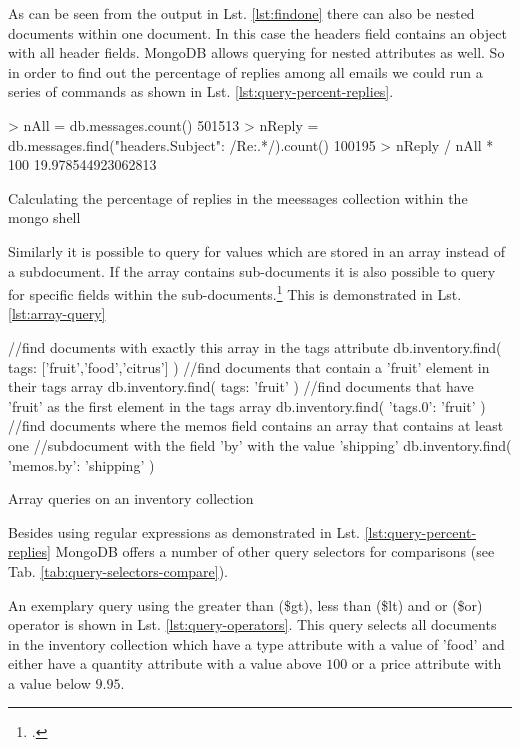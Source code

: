 As can be seen from the output in Lst. \ref{lst:findone} there can also be nested documents
within one document. In this case the headers field contains an object with all header fields.
MongoDB allows querying for nested attributes as well. So in order to find out the percentage of
replies among all emails we could run a series of commands as shown in Lst. \ref{lst:query-percent-replies}.

\begin{listing}
    \begin{javascriptcode}
> nAll = db.messages.count()
501513
> nReply = db.messages.find({"headers.Subject": /Re:.*/}).count()
100195
> nReply / nAll * 100
19.978544923062813
    \end{javascriptcode}
    \caption[Calculating the percentage of replies]{Calculating the percentage of replies in the meessages collection within the mongo shell}
    \label{lst:query-percent-replies}
\end{listing}

Similarly it is possible to query for values which are stored in an array
instead of a subdocument.
If the array contains sub-documents it is also possible to query for specific
fields within the sub-documents.\footcite[Cf.][10]{mongo_crud_manual} This is
demonstrated in Lst. \ref{lst:array-query}

\begin{listing}
    \begin{javascriptcode}
//find documents with exactly this array in the tags attribute
db.inventory.find( { tags: ['fruit','food','citrus'] } )
//find documents that contain a 'fruit' element in their tags array
db.inventory.find( { tags: 'fruit'} )
//find documents that have 'fruit' as the first element in the tags array
db.inventory.find( {'tags.0': 'fruit'} )
//find documents where the memos field contains an array that contains at least one
//subdocument with the field 'by' with the value 'shipping'
db.inventory.find( {'memos.by': 'shipping'} )
    \end{javascriptcode}
    \caption{Array queries on an inventory collection}
    \label{lst:array-query}
\end{listing}

Besides using regular expressions as demonstrated in Lst. \ref{lst:query-percent-replies} MongoDB
offers a number of other query selectors for comparisons (see Tab. \ref{tab:query-selectors-compare}).

An exemplary query using the greater than (\$gt), less than (\$lt) and or (\$or) operator
is shown in Lst. \ref{lst:query-operators}.
This query selects all documents in the inventory collection which have a type attribute with
a value of 'food' and either have  a quantity attribute with a value above $100$ or a price attribute
with a value below $9.95$.

